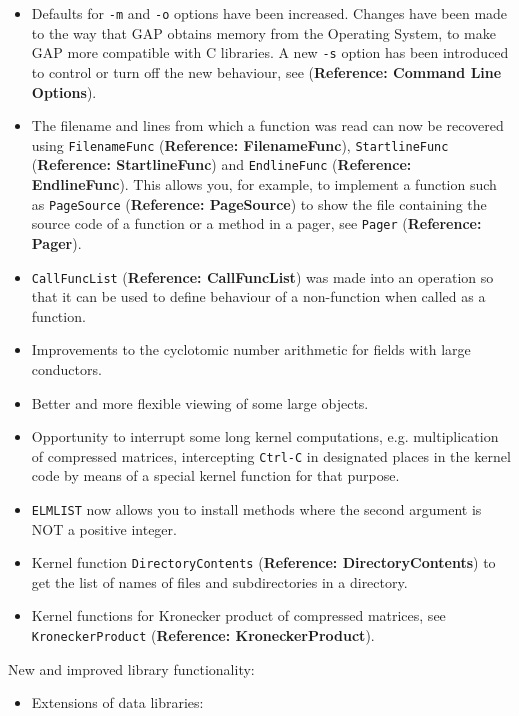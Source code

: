 \documentclass[a4paper,11pt]{report}
\begin{document}
{{{\begin{itemize}
endianness, so that random seeds can now be transferred between architectures.
See  (\textbf{Reference: GlobalMersenneTwister}) for details. 
\item  Defaults for \texttt{-m} and \texttt{-o} options have been increased. Changes have been made to the way that \textsf{GAP} obtains memory from the Operating System, to make \textsf{GAP} more compatible with C libraries. A new \texttt{-s} option has been introduced to control or turn off the new behaviour, see  (\textbf{Reference: Command Line Options}). 
\item  The filename and lines from which a function was read can now be recovered
using \texttt{FilenameFunc} (\textbf{Reference: FilenameFunc}), \texttt{StartlineFunc} (\textbf{Reference: StartlineFunc}) and \texttt{EndlineFunc} (\textbf{Reference: EndlineFunc}). This allows you, for example, to implement a function such as \texttt{PageSource} (\textbf{Reference: PageSource}) to show the file containing the source code of a function or a method in a
pager, see \texttt{Pager} (\textbf{Reference: Pager}). 
\item  \texttt{CallFuncList} (\textbf{Reference: CallFuncList}) was made into an operation so that it can be used to define behaviour of a
non-function when called as a function. 
\item  Improvements to the cyclotomic number arithmetic for fields with large
conductors. 
\item  Better and more flexible viewing of some large objects. 
\item  Opportunity to interrupt some long kernel computations, e.g. multiplication of
compressed matrices, intercepting \texttt{Ctrl-C} in designated places in the kernel code by means of a special kernel function
for that purpose. 
\item  \texttt{ELM{\textunderscore}LIST} now allows you to install methods where the second argument is NOT a positive
integer. 
\item  Kernel function \texttt{DirectoryContents} (\textbf{Reference: DirectoryContents}) to get the list of names of files and subdirectories in a directory. 
\item  Kernel functions for Kronecker product of compressed matrices, see \texttt{KroneckerProduct} (\textbf{Reference: KroneckerProduct}). 
\end{itemize}
 New and improved library functionality:  
\begin{itemize}
\item  Extensions of data libraries: 

\end{itemize}}}}
\end{document}
